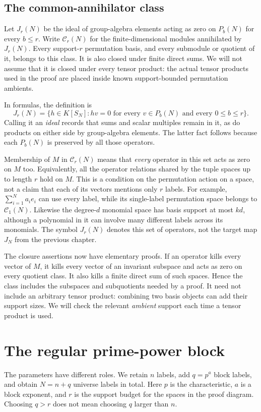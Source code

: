 \subsection*{The common-annihilator class}
Let $J_r(N)$ be the ideal of group-algebra elements acting as zero on
$P_b(N)$ for every $b\le r$. Write $\mathcal C_r(N)$ for the
finite-dimensional modules annihilated by $J_r(N)$. Every support-$r$
permutation basis, and every submodule or quotient of it, belongs to this
class. It is also closed under finite direct sums. We will not assume
that it is closed under every tensor product: the actual tensor products
used in the proof are placed inside known support-bounded permutation
ambients.

In formulas, the definition is
\[
 J_r(N)=\{h\in K[S_N]:h v=0\text{ for every }v\in P_b(N)
                                  \text{ and every }0\le b\le r\}.
\]
Calling it an \emph{ideal} records that sums and scalar multiples
remain in it, as do products on either side by group-algebra
elements. The latter fact follows because each $P_b(N)$ is preserved
by all those operators.

Membership of $M$ in $\mathcal C_r(N)$ means that \emph{every}
operator in this set acts as zero on $M$ too. Equivalently, all the
operator relations shared by the tuple spaces up to length $r$ hold
on $M$. This is a condition on the permutation action on a space,
not a claim that each of its vectors mentions only $r$ labels.
For example, $\sum_{i=1}^N a_i e_i$ can use every label, while its
single-label permutation space belongs to $\mathcal C_1(N)$.
Likewise the degree-$d$ monomial space has basis support at most
$kd$, although a polynomial in it can involve many different labels
across its monomials.
The symbol $J_r(N)$ denotes this set of operators, not the target
map $J_N$ from the previous chapter.

The closure assertions now have elementary proofs. If an operator
kills every vector of $M$, it kills every vector of an invariant
subspace and acts as zero on every quotient class. It also kills
a finite direct sum of such spaces. Hence the class includes the
subspaces and subquotients needed by a proof. It need not include
an arbitrary tensor product: combining two basis objects can add
their support sizes. We will check the relevant \emph{ambient}
support each time a tensor product is used.

\section{The regular prime-power block}
The parameters have different roles. We retain $n$ labels, add
$q=p^a$ block labels, and obtain $N=n+q$ universe labels in total.
Here $p$ is the characteristic, $a$ is a block exponent, and $r$
is the support budget for the spaces in the proof diagram. Choosing
$q>r$ does not mean choosing $q$ larger than $n$.

